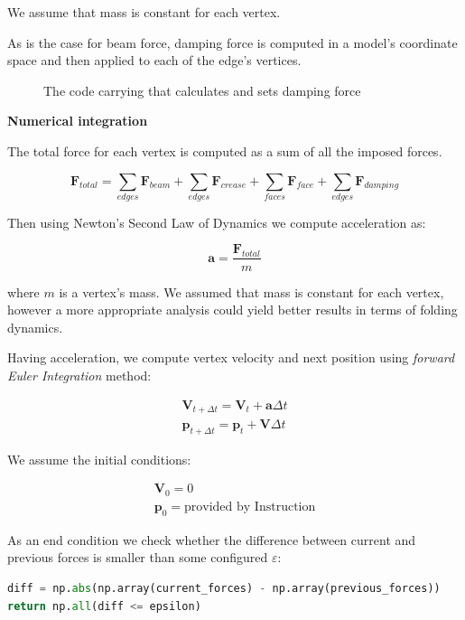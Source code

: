 We assume that mass is constant for each vertex.

As is the case for beam force, damping force is computed in a model's coordinate space
and then applied to each of the edge's vertices.
\smallskip

\begin{figure}[H]
	\centering
	\caption{The code carrying that calculates and sets damping force}
	
\end{figure}

\medskip
\textbf{Numerical integration}
\smallskip

The total force for each vertex is computed as a sum of all the imposed forces.

\begin{equation} \label{Solver:total_force}
	\pmb{F}_{total} = \sum_{edges} \pmb{F}_{beam} + \sum_{edges} \pmb{F}_{crease} + \sum_{faces}\pmb{F}_{face} + \sum_{edges}\pmb{F}_{damping}
\end{equation}

Then using Newton's Second Law of Dynamics we compute acceleration as:

$$
\pmb{a} = \frac{\pmb{F}_{total}}{m}
$$

where $m$ is a vertex's mass. We assumed that mass is constant for each vertex, however a more appropriate analysis could yield
better results in terms of folding dynamics.

Having acceleration, we compute vertex velocity and next position using \textit{forward Euler Integration} method:

$$
\begin{aligned}
\pmb{V}_{t+\Delta t} = \pmb{V}_t + \pmb{a}\Delta t \\
\pmb{p}_{t+\Delta t} = \pmb{p}_t + \pmb{V}\Delta t
\end{aligned}
$$

We assume the initial conditions:

\begin{equation}
	\begin{aligned}
		\pmb{V}_0 = 0\\
		\pmb{p}_0 = \text{provided by Instruction}
	\end{aligned}
\end{equation}


As an end condition we check whether the difference between current and previous forces is smaller than some configured $\varepsilon$:

\begin{lstlisting}[language=Python]
diff = np.abs(np.array(current_forces) - np.array(previous_forces))
return np.all(diff <= epsilon)
\end{lstlisting}

